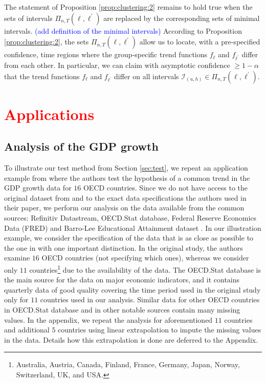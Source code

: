 \documentclass[a4paper,12pt]{article}
\begin{document}
The statement of Proposition \ref{prop:clustering:2} remains to hold true when the sets of intervals $\Pi_{n,T}(\ell,\ell^\prime)$ are replaced by the corresponding sets of minimal intervals. \textcolor{blue}{(add definition of the minimal intervals)}  According to Proposition \ref{prop:clustering:2}, the sets $\Pi_{n,T}(\ell,\ell^\prime)$ allow us to locate, with a pre-specified confidence, time regions where the group-specific trend functions $f_\ell$ and $f_{\ell^\prime}$ differ from each other. In particular, we can claim with asymptotic confidence $\ge 1 - \alpha$ that the trend functions $f_\ell$ and $f_{\ell^\prime}$ differ on all intervals $\mathcal{I}_{(u,h)} \in \Pi_{n,T}(\ell,\ell^\prime)$.


\section{\textcolor{red}{Applications}}\label{sec:app}
\subsection{Analysis of the GDP growth}\label{subsec:app:gdp}


To illustrate our test method from Section \ref{sec:test}, we repeat an application example from \cite{Zhang2012} where the authors test the hypothesis of a common trend in the GDP growth data for $16$ OECD countries. Since we do not have access to the original dataset from \cite{Zhang2012} and to the exact data specifications the authors used in their paper, we perform our analysis on the data available from the common sources: Refinitiv Datastream, OECD.Stat database, Federal Reserve Economics Data (FRED) and Barro-Lee Educational Attainment dataset \citep*{Barro2013}. In our illustration example, we consider the specification of the data that is as close as possible to the one in \linebreak \cite{Zhang2012} with one important distinction. In the original study, the authors examine $16$ OECD countries (not specifying which ones), whereas we consider only $11$ countries\footnote{Australia, Austria, Canada, Finland, France, Germany, Japan, Norway, Switzerland, UK, and USA.} due to the availability of the data. The OECD.Stat database is the main source for the data on major economic indicators, and it contains  quarterly data of good quality covering the time period used in the original study only for $11$ countries used in our analysis. Similar data for other OECD countries in OECD.Stat database and in other notable sources contain many missing values. In the appendix, we repeat the analysis for aforementioned $11$ countries and additional $5$ countries using linear extrapolation to impute the missing values in the data. Details how this extrapolation is done are deferred to the Appendix.
\end{document}
